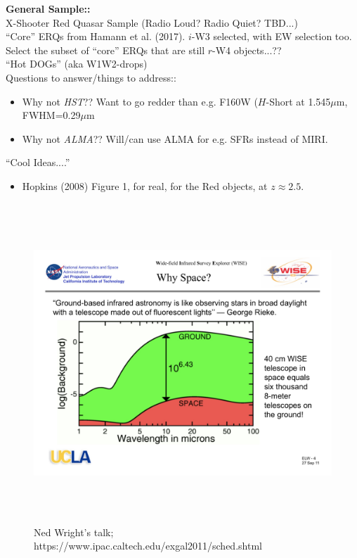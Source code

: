 \smallskip
\smallskip
\noindent
{\bf General Sample::} \\
X-Shooter Red Quasar Sample (Radio Loud? Radio Quiet? TBD...)\\
``Core'' ERQs from Hamann et al. (2017). $i$-W3 selected, with \civ EW selection too. \\
Select the subset of ``core'' ERQs that are still $r$-W4 objects...??\\
``Hot DOGs'' (aka W1W2-drops)\\


\smallskip
\smallskip
\noindent
Questions to answer/things to address:: 
\begin{itemize}
\item Why not {\it HST}??  Want to go redder than e.g. F160W	($H$-Short at 1.545$\mu$m, FWHM=0.29$\mu$m
\item Why not {\it ALMA}?? Will/can use ALMA for e.g. SFRs instead of MIRI.
\end{itemize}


\smallskip
\smallskip
\noindent
``Cool Ideas....'' 
\begin{itemize}
\item Hopkins (2008) Figure 1, for real, for the Red objects, at $z\approx2.5$. 
\end{itemize}

\hspace{-7.5cm}
\begin{figure}[h]
  \begin{center}
    \hspace{-0.5cm}
    \includegraphics[height=12.0cm,width=16.0cm]{IR_Ground_vs_Space_backgrounds.jpeg}
    \vspace{-10pt}
\caption{Ned Wright's talk; 
https://www.ipac.caltech.edu/exgal2011/sched.shtml}
    \label{figtest-fig}
  \end{center}
\end{figure}

